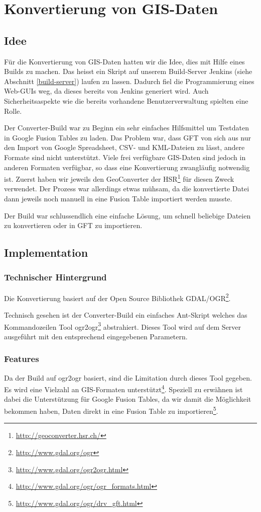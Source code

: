 \chapter{Konvertierung von GIS-Daten}
\label{converter-build}

\section{Idee}
Für die Konvertierung von \gls{GIS}-Daten hatten wir die Idee, dies mit Hilfe eines Builds zu machen. Das heisst ein Skript auf unserem Build-Server Jenkins (siehe Abschnitt \ref{build-server}) laufen zu lassen. Dadurch fiel die Programmierung eines Web-GUIs weg, da dieses bereits von Jenkins generiert wird. Auch Sicherheitsaspekte wie die bereits vorhandene Benutzerverwaltung spielten eine Rolle.

Der Converter-Build war zu Beginn ein sehr einfaches Hilfsmittel um Testdaten in Google Fusion Tables zu laden. Das Problem war, dass GFT von sich aus nur den Import von Google Spreadsheet, \gls{CSV}- und \gls{KML}-Dateien zu lässt, andere Formate sind nicht unterstützt. Viele frei verfügbare \gls{GIS}-Daten sind jedoch in anderen Formaten verfügbar, so dass eine Konvertierung zwangläufig notwendig ist. Zuerst haben wir jeweils den GeoConverter der HSR\footnote{\url{http://geoconverter.hsr.ch/}} für diesen Zweck verwendet. Der Prozess war allerdings etwas mühsam, da die konvertierte Datei dann jeweils noch manuell in eine Fusion Table importiert werden musste.

Der Build war schlussendlich eine einfache Lösung, um schnell beliebige Dateien zu konvertieren oder in GFT zu importieren.

\section{Implementation}
\subsection{Technischer Hintergrund}
Die Konvertierung basiert auf der Open Source Bibliothek GDAL/OGR\footnote{\url{http://www.gdal.org/ogr}}.

Technisch gesehen ist der Converter-Build ein einfaches Ant-Skript welches das Kommandozeilen Tool ogr2ogr\footnote{\url{http://www.gdal.org/ogr2ogr.html}} abstrahiert. Dieses Tool wird auf dem Server ausgeführt mit den entsprechend eingegebenen Parametern. 

\subsection{Features}
Da der Build auf ogr2ogr basiert, sind die Limitation durch dieses Tool gegeben. Es wird eine Vielzahl an \gls{GIS}-Formaten unterstützt\footnote{\url{http://www.gdal.org/ogr/ogr_formats.html}}. Speziell zu erwähnen ist dabei die Unterstützung für Google Fusion Tables, da wir damit die Möglichkeit bekommen haben, Daten direkt in eine Fusion Table zu importieren\footnote{\url{http://www.gdal.org/ogr/drv_gft.html}}.

